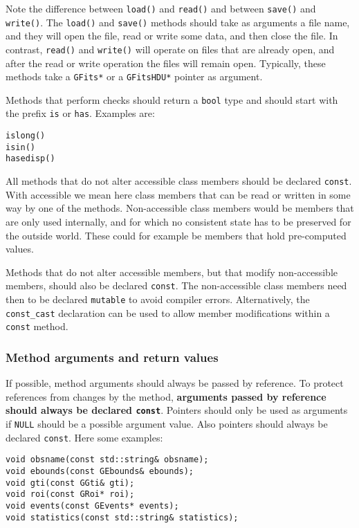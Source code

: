 \documentclass{article}[12pt,a4]
\begin{document}
Note the difference between {\tt load()} and {\tt read()} and between {\tt save()} and {\tt write()}.
The {\tt load()} and {\tt save()} methods should take as arguments a file name, and they
will open the file, read or write some data, and then close the file.
In contrast, {\tt read()} and {\tt write()} will operate on files that are already open, and after
the read or write operation the files will remain open.
Typically, these methods take a {\tt GFits*} or a {\tt GFitsHDU*} pointer as argument.

Methods that perform checks should return a {\tt bool} type and should start with the
prefix {\tt is} or {\tt has}.
Examples are:
\begin{verbatim}
islong()
isin()
hasedisp()
\end{verbatim}

All methods that do not alter accessible class members should be declared {\tt const}.
With accessible we mean here class members that can be read or written in some
way by one of the methods.
Non-accessible class members would be members that are only used internally, and
for which no consistent state has to be preserved for the outside world.
These could for example be members that hold pre-computed values.

Methods that do not alter accessible members, but that modify non-accessible
members, should also be declared {\tt const}.
The non-accessible class members need then to be declared {\tt mutable} to avoid
compiler errors.
Alternatively, the {\tt const\_cast} declaration can be used to allow member modifications
within a {\tt const} method.


\subsubsection{Method arguments and return values}


If possible, method arguments should always be passed by reference.
To protect references from changes by the method, {\bf arguments passed by reference
should always be declared {\tt const}}.
Pointers should only be used as arguments if {\tt NULL} should be a possible
argument value.
Also pointers should always be declared {\tt const}.
Here some examples:
\begin{verbatim}
void obsname(const std::string& obsname);
void ebounds(const GEbounds& ebounds);
void gti(const GGti& gti);
void roi(const GRoi* roi);
void events(const GEvents* events);
void statistics(const std::string& statistics);
\end{verbatim}
\end{document}
